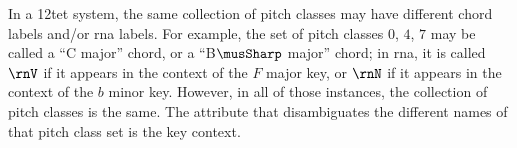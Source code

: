 
In a \gls{12tet} system, the same collection of pitch
classes may have different chord labels and/or \gls{rna}
labels. For example, the set of pitch classes {$0$, $4$,
$7$} may be called a ``C major'' chord, or a ``B$\musSharp$
major'' chord; in \gls{rna}, it is called $\rnV$ if it
appears in the context of the $F$ major key, or $\rnN$ if it
appears in the context of the $b$ minor key. However, in all
of those instances, the collection of pitch classes is the
same. The attribute that disambiguates the different names
of that pitch class set is the key context.
